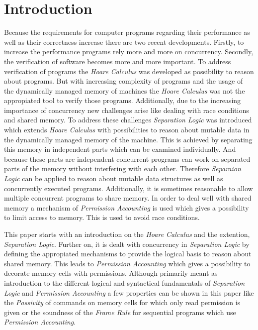 \section{Introduction}
	Because the requirements for computer programs regarding their performance
	as well as their correctness increase there are two recent developments.
	Firstly, to increase the performance programs rely more and more on
	concurrency. Secondly, the verification of software becomes more and more
	important. To address verification of programs the \emph{Hoare Calculus}
	was developed as possibility to reason about programs. But with increasing
	complexity of programs and the usage of the dynamically managed memory of
	machines the \emph{Hoare Calculus} was not the appropiated tool to verify
	those programs. Additionally, due to the increasing importance of concurrency
	new challenges arise like dealing with race conditions and shared memory.
	To address these challenges \emph{Separation Logic} was introduced which
	extends \emph{Hoare Calculus} with possibilities to reason about mutable
	data in the dynamically managed memory of the machine. This is achieved by
	separating this memory in independent parts which can be examined
	individually. And because these parts are independent concurrent programs
	can work on separated parts of the memory without interfering with each
	other. Therefore \emph{Separaion Logic} can be applied to reason about
	mutable data structures as well as concurrently executed programs. Additionally,
	it is sometimes reasonable to allow multiple concurrent programs to share
	memory. In order to deal well with shared memory a mechanism of \emph{Permission
	Accounting} is used which gives a possibility to limit access to memory.
	This is used to avoid race conditions.
	
	This paper starts with an introduction
	on the \emph{Hoare Calculus} and the extention, \emph{Separation Logic}.
	Further on, it is dealt with concurrency in \emph{Separation Logic} by
	defining the appropiated mechanisms to provide the logical basis to reason
	about shared memory. This leads to \emph{Permission Accounting} which gives
	a possibility to decorate memory cells with permissions. Although primarily
	meant as introduction to the different logical and syntactical fundamentals
	of \emph{Separation Logic} and \emph{Permission Accounting} a
	few properties can be shown in this paper like the \emph{Passivity} of commands on memory
	cells for which only read permission is given or the soundness of the
	\emph{Frame Rule} for sequential programs which use \emph{Permission
	Accounting}.
